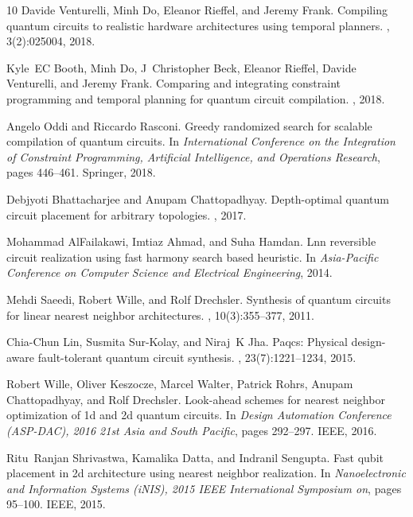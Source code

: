\documentclass[journal,10pt,twocolumn]{IEEEtran}
\begin{document}
\begin{thebibliography}{10}
Davide Venturelli, Minh Do, Eleanor Rieffel, and Jeremy Frank.
\newblock Compiling quantum circuits to realistic hardware architectures using
  temporal planners.
, 3(2):025004, 2018.

Kyle~EC Booth, Minh Do, J~Christopher Beck, Eleanor Rieffel, Davide Venturelli,
  and Jeremy Frank.
\newblock Comparing and integrating constraint programming and temporal
  planning for quantum circuit compilation.
, 2018.

Angelo Oddi and Riccardo Rasconi.
\newblock Greedy randomized search for scalable compilation of quantum
  circuits.
\newblock In {\em International Conference on the Integration of Constraint
  Programming, Artificial Intelligence, and Operations Research}, pages
  446--461. Springer, 2018.

Debjyoti Bhattacharjee and Anupam Chattopadhyay.
\newblock Depth-optimal quantum circuit placement for arbitrary topologies.
, 2017.

Mohammad AlFailakawi, Imtiaz Ahmad, and Suha Hamdan.
\newblock Lnn reversible circuit realization using fast harmony search based
  heuristic.
\newblock In {\em Asia-Pacific Conference on Computer Science and Electrical
  Engineering}, 2014.

Mehdi Saeedi, Robert Wille, and Rolf Drechsler.
\newblock Synthesis of quantum circuits for linear nearest neighbor
  architectures.
, 10(3):355--377, 2011.

Chia-Chun Lin, Susmita Sur-Kolay, and Niraj~K Jha.
\newblock Paqcs: Physical design-aware fault-tolerant quantum circuit
  synthesis.
, 23(7):1221--1234, 2015.

Robert Wille, Oliver Keszocze, Marcel Walter, Patrick Rohrs, Anupam
  Chattopadhyay, and Rolf Drechsler.
\newblock Look-ahead schemes for nearest neighbor optimization of 1d and 2d
  quantum circuits.
\newblock In {\em Design Automation Conference (ASP-DAC), 2016 21st Asia and
  South Pacific}, pages 292--297. IEEE, 2016.

Ritu~Ranjan Shrivastwa, Kamalika Datta, and Indranil Sengupta.
\newblock Fast qubit placement in 2d architecture using nearest neighbor
  realization.
\newblock In {\em Nanoelectronic and Information Systems (iNIS), 2015 IEEE
  International Symposium on}, pages 95--100. IEEE, 2015.


\end{thebibliography}
\end{document}
